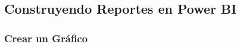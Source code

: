 \documentclass[12pt,letterpaper]{article}
\begin{document}
    \subsection{Construyendo Reportes en Power BI}
    \subsubsection{Crear un Gráfico}
\end{document}
